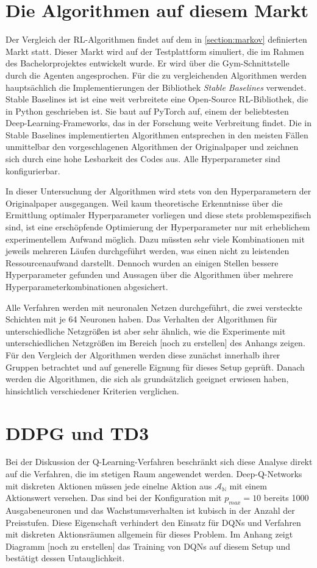 \section{Die Algorithmen auf diesem Markt}
Der Vergleich der RL-Algorithmen findet auf dem in \ref{section:markov} definierten Markt statt.
Dieser Markt wird auf der Testplattform simuliert, die im Rahmen des Bachelorprojektes entwickelt wurde.
Er wird über die Gym-Schnittstelle durch die Agenten angesprochen.
Für die zu vergleichenden Algorithmen werden hauptsächlich die Implementierungen der Bibliothek \textit{Stable Baselines} verwendet. \cite{stable-baselines}
Stable Baselines ist ist eine weit verbreitete eine Open-Source RL-Bibliothek, die in Python geschrieben ist.
Sie baut auf PyTorch auf, einem der beliebtesten Deep-Learning-Frameworks, das in der Forschung weite Verbreitung findet. \cite{NEURIPS2019_9015}
Die in Stable Baselines implementierten Algorithmen entsprechen in den meisten Fällen unmittelbar den vorgeschlagenen Algorithmen der Originalpaper und zeichnen sich durch eine hohe Lesbarkeit des Codes aus.
Alle Hyperparameter sind konfigurierbar.

In dieser Untersuchung der Algorithmen wird stets von den Hyperparametern der Originalpaper ausgegangen.
Weil kaum theoretische Erkenntnisse über die Ermittlung optimaler Hyperparameter vorliegen und diese stets problemspezifisch sind, ist eine erschöpfende Optimierung der Hyperparameter nur mit erheblichem experimentellem Aufwand möglich.
Dazu müssten sehr viele Kombinationen mit jeweils mehreren Läufen durchgeführt werden, was einen nicht zu leistenden Ressourcenaufwand darstellt.
Dennoch wurden an einigen Stellen bessere Hyperparameter gefunden und Aussagen über die Algorithmen über mehrere Hyperparameterkombinationen abgesichert.

Alle Verfahren werden mit neuronalen Netzen durchgeführt, die zwei versteckte Schichten mit je 64 Neuronen haben.
Das Verhalten der Algorithmen für unterschiedliche Netzgrößen ist aber sehr ähnlich, wie die Experimente mit unterschiedlichen Netzgrößen im Bereich [noch zu erstellen] des Anhangs zeigen.
Für den Vergleich der Algorithmen werden diese zunächst innerhalb ihrer Gruppen betrachtet und auf generelle Eignung für dieses Setup geprüft.
Danach werden die Algorithmen, die sich als grundsätzlich geeignet erwiesen haben, hinsichtlich verschiedener Kriterien verglichen.

\section{DDPG und TD3}
\label{section:main_ddpg}
Bei der Diskussion der Q-Learning-Verfahren beschränkt sich diese Analyse direkt auf die Verfahren, die im stetigen Raum angewendet werden.
Deep-Q-Networks mit diskreten Aktionen müssen jede einelne Aktion aus $\mathcal{A_\mathbb{N}}$ mit einem Aktionswert versehen.
Das sind bei der Konfiguration mit $p_{max}=10$ bereits 1000 Ausgabeneuronen und das Wachstumsverhalten ist kubisch in der Anzahl der Preisstufen.
Diese Eigenschaft verhindert den Einsatz für DQNs und Verfahren mit diskreten Aktionsräumen allgemein für dieses Problem.
Im Anhang zeigt Diagramm [noch zu erstellen] das Training von DQNs auf diesem Setup und bestätigt dessen Untauglichkeit.

